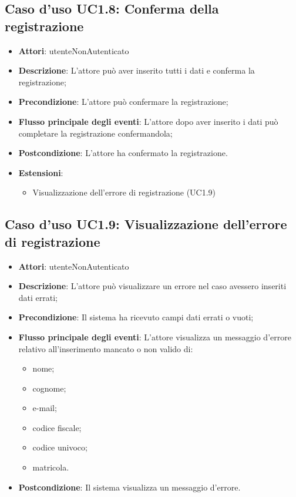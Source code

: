 \subsection{Caso d'uso \texorpdfstring{UC1.8}{UC1.8}: Conferma della registrazione}
\begin{itemize}
\item \textbf{Attori}: utenteNonAutenticato
\item \textbf{Descrizione}: L'attore può aver inserito tutti i dati  e conferma la registrazione;
\item \textbf{Precondizione}: L'attore può confermare la registrazione;
\item \textbf{Flusso principale degli eventi}: L'attore dopo aver inserito i dati può completare la registrazione confermandola;
\item \textbf{Postcondizione}: L'attore ha confermato la registrazione.
\item \textbf{Estensioni}:
\begin{itemize}
\item Visualizzazione dell'errore di registrazione (UC1.9)
\end{itemize}
\end{itemize}
\subsection{Caso d'uso \texorpdfstring{UC1.9}{UC1.9}: Visualizzazione dell'errore di registrazione}
\begin{itemize}
\item \textbf{Attori}: utenteNonAutenticato
\item \textbf{Descrizione}: L'attore può visualizzare un errore nel caso avessero inseriti dati errati;
\item \textbf{Precondizione}: Il sistema ha ricevuto campi dati errati o vuoti;
\item \textbf{Flusso principale degli eventi}: L'attore visualizza un messaggio d'errore relativo all'inserimento mancato o non valido di:
\begin{itemize}
\item nome;
\item cognome;
\item e-mail;
\item codice fiscale;
\item codice univoco;
\item matricola.
\end{itemize}
\item \textbf{Postcondizione}: Il sistema visualizza un messaggio d'errore.
\end{itemize}

